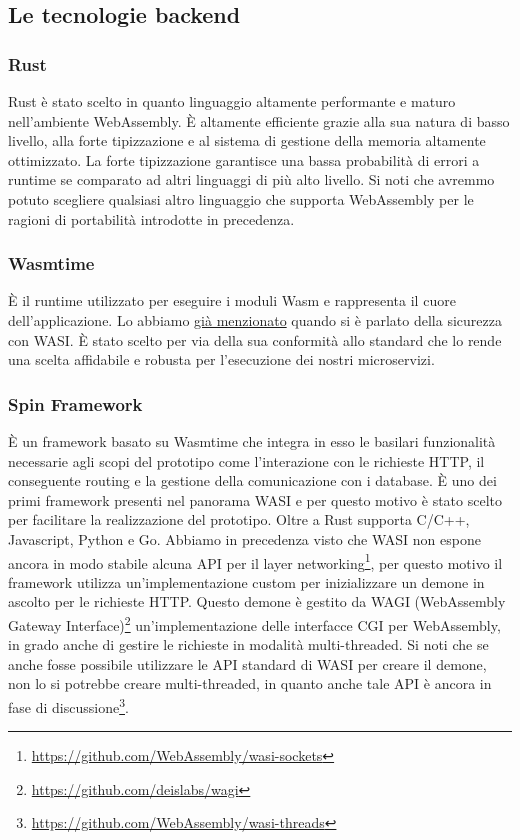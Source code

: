 \subsection{Le tecnologie backend}
\subsubsection{Rust}
Rust è stato scelto in quanto linguaggio altamente performante e maturo nell'ambiente WebAssembly. È altamente
efficiente grazie alla sua natura di basso livello, alla forte tipizzazione e al sistema di gestione della memoria
altamente ottimizzato. La forte tipizzazione garantisce una bassa probabilità di errori a runtime se comparato ad altri
linguaggi di più alto livello. Si noti che avremmo potuto scegliere qualsiasi altro linguaggio che supporta WebAssembly
per le ragioni di portabilità introdotte in precedenza.

\subsubsection{Wasmtime}
È il runtime utilizzato per eseguire i moduli Wasm e rappresenta il cuore dell'applicazione. Lo abbiamo
\hyperref[sec:capability-example]{già menzionato} quando si è parlato della sicurezza con WASI. È stato scelto per via
della sua conformità allo standard che lo rende una scelta affidabile e robusta per l'esecuzione dei nostri
microservizi.

\subsubsection{Spin Framework}
È un framework basato su Wasmtime che integra in esso le basilari funzionalità necessarie agli scopi del prototipo come
l'interazione con le richieste HTTP, il conseguente routing e la gestione della comunicazione con i database. È uno dei
primi framework presenti nel panorama WASI e per questo motivo è stato scelto per facilitare la realizzazione del
prototipo. Oltre a Rust supporta C/C++, Javascript, Python e Go. Abbiamo in precedenza visto che WASI non espone ancora
in modo stabile alcuna API per il layer networking\footnote{\url{https://github.com/WebAssembly/wasi-sockets}}, per
questo motivo il framework utilizza un'implementazione custom per inizializzare un demone in ascolto per le richieste
HTTP. Questo demone è gestito da WAGI (WebAssembly Gateway Interface)\footnote{\url{https://github.com/deislabs/wagi}}
un'implementazione delle interfacce CGI\cite{RFC3875} per WebAssembly, in grado anche di gestire le richieste in
modalità multi-threaded. Si noti che se anche fosse possibile utilizzare le API standard di WASI per creare il demone,
non lo si potrebbe creare multi-threaded, in quanto anche tale API è ancora in fase di
discussione\footnote{\url{https://github.com/WebAssembly/wasi-threads}}.

